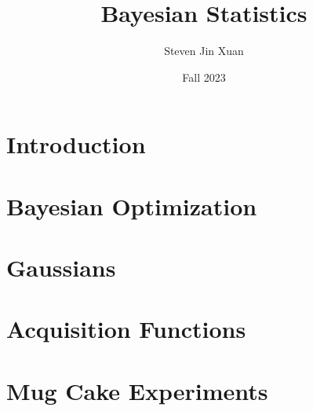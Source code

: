 \documentclass{article}[12, letterpaper]
\author{Steven Jin Xuan}
\date{Fall 2023}
\title{Bayesian Statistics}
\begin{document}

\section{Introduction}

\section{Bayesian Optimization}

\section{Gaussians}





\section{Acquisition Functions}

\section{Mug Cake Experiments}


\pagebreak
{}

\end{document}
